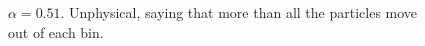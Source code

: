 \begin{figure}[htbp]
    \caption{$\alpha = 0.51$. Unphysical, saying that more than all the particles move out of each bin.}
    \label{fig:1d_diffusion_0_51}
  \end{figure}
  
